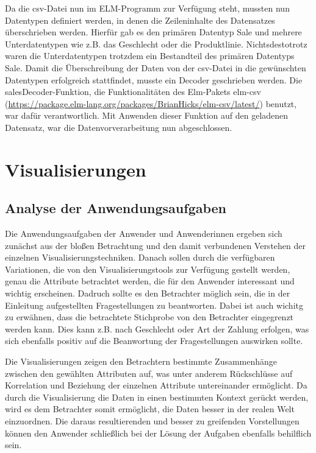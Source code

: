 \documentclass[usegeometry=true]{scrartcl}
\begin{document}
\noindent Da die csv-Datei nun im ELM-Programm zur Verfügung steht, mussten nun Datentypen definiert werden, in denen die Zeileninhalte des Datensatzes überschrieben werden.
Hierfür gab es den primären Datentyp Sale und mehrere Unterdatentypen wie z.B. das Geschlecht oder die Produktlinie. Nichtsdestotrotz waren die Unterdatentypen trotzdem ein
Bestandteil des primären Datentyps Sale. Damit die Überschreibung der Daten von der csv-Datei in die gewünschten Datentypen erfolgreich stattfindet, musste ein Decoder
geschrieben werden. Die salesDecoder-Funktion, die Funktionalitäten des Elm-Pakets elm-csv (\url{https://package.elm-lang.org/packages/BrianHicks/elm-csv/latest/}) benutzt, war
dafür verantwortlich. Mit Anwenden dieser Funktion auf den geladenen Datensatz, war die Datenvorverarbeitung nun abgeschlossen.

\section{Visualisierungen}
\subsection{Analyse der Anwendungsaufgaben}
Die Anwendungsaufgaben der Anwender und Anwenderinnen ergeben sich zunächst aus der bloßen Betrachtung und den damit verbundenen Verstehen der einzelnen Visualisierungstechniken.
Danach sollen durch die verfügbaren Variationen, die von den Visualisierungstools zur Verfügung gestellt werden, genau die Attribute betrachtet werden, die für den Anwender
interessant und wichtig erscheinen. Dadruch sollte es den Betrachter möglich sein, die in der Einleitung aufgestellten Fragestellungen zu beantworten. Dabei ist auch wichitg zu
erwähnen, dass die betrachtete Stichprobe von den Betrachter eingegrenzt werden kann. Dies kann z.B. nach Geschlecht oder Art der Zahlung erfolgen, was sich ebenfalls positiv
auf die Beanwortung der Fragestellungen auswirken sollte.

\noindent Die Visualisierungen zeigen den Betrachtern bestimmte Zusammenhänge zwischen den gewählten Attributen auf, was unter anderem Rückschlüsse auf Korrelation
und Beziehung der einzelnen Attribute untereinander ermöglicht. Da durch die Visualisierung die Daten in einen bestimmten Kontext gerückt werden, wird es dem Betrachter somit
ermöglicht, die Daten besser in der realen Welt einzuordnen. Die daraus resultierenden und besser zu greifenden Vorstellungen können den Anwender schließlich bei der Lösung der
Aufgaben ebenfalls behilflich sein.
\end{document}
